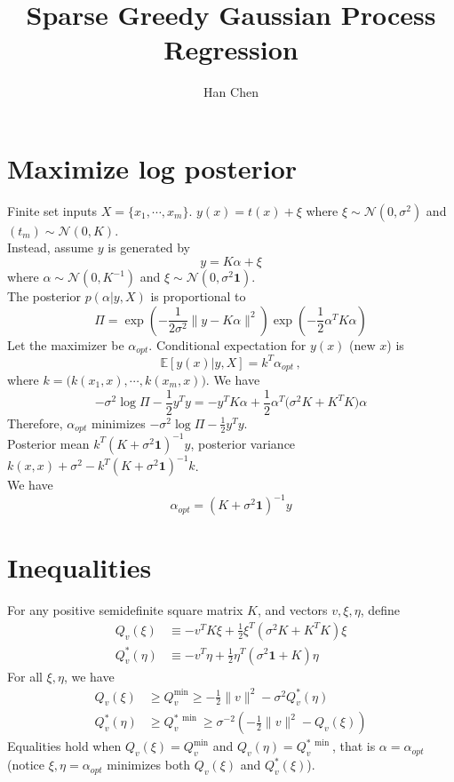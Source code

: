 \documentclass[a4paper,onecolumn]{article}
\begin{document}
\setcounter{page}{1}

\title{Sparse Greedy Gaussian Process Regression}
\date{}
\author{Han Chen}
\maketitle
\section{Maximize log posterior}
Finite set inputs $X = \{x_1,\cdots, x_m\}$.
$
    y(x) = t(x)+\xi
$
where $\xi\sim \mathcal{N}(0, \sigma^2)$ and $(t_m) \sim \mathcal{N}(0, K)$.\\

Instead, assume $y$ is generated by
$$
    y = K\alpha + \xi
$$
where $\alpha \sim \mathcal{N}(0, K^{-1})$ and $\xi \sim \mathcal{N}(0,\sigma^2\mathbf{1})$.\\
The posterior $p(\alpha|y, X)$ is proportional to
$$
    \Pi = \exp(-\frac{1}{2 \sigma^2} \|y-K\alpha\|^2) \exp(-\frac{1}{2}\alpha^T K \alpha)
$$
Let the maximizer be $\alpha_{opt}$.
Conditional expectation for $y(x)$ (new $x$) is
$$
    \mathbb{E}[y(x)| y, X] =  k^T \alpha_{opt}\,,
$$
where $k = \big( k(x_1, x), \cdots, k(x_m, x)\big)$.
We have
$$
    -\sigma^2 \log \Pi - \frac{1}{2}y^T y=
    - y^T K\alpha + \frac{1}{2} \alpha^T \big( \sigma^2 K + K^T K \big)\alpha
$$
Therefore, $\alpha_{opt}$ minimizes $-\sigma^2 \log \Pi - \frac{1}{2}y^T y$.\\
Posterior mean $k^T (K+\sigma^2 \mathbf{1})^{-1} y$, posterior variance
$k(x,x)+ \sigma^2 - k^T (K+\sigma^2\mathbf{1})^{-1}k$.\\
We have 
$$
    \alpha_{opt} = (K+\sigma^2 \mathbf{1})^{-1} y
$$
\section{Inequalities}
For any positive semidefinite square matrix $K$, and vectors $v, \xi, \eta$, define
\begin{equation*}\begin{split}
    Q_v(\xi) & \equiv - v^T K \xi + \frac{1}{2} \xi^T (\sigma^2 K + K^T K) \xi\\
    Q^*_v(\eta) &\equiv - v^T \eta + \frac{1}{2}\eta^T (\sigma^2 \mathbf{1} + K)\eta
\end{split}\end{equation*}
For all $\xi, \eta$, we have
\begin{equation*}\begin{split}
    Q_v(\xi) &\ge Q_{v}^{\min} \ge -\frac{1}{2}\|v\|^2 - \sigma^2 Q^*_v(\eta)\\
    Q_v^*(\eta) &\ge Q^{*\, \min}_v \ge \sigma^{-2} \left(- \frac{1}{2}\|v\|^2 - Q_v(\xi)\right)
\end{split}\end{equation*}
Equalities hold when $Q_v(\xi) = Q_v^{\min}$ and $Q_v(\eta) = Q^{*\, \min}_v$, that is
$\alpha=\alpha_{opt}$ (notice $\xi,\eta=\alpha_{opt}$ minimizes both $Q_v(\xi)$ and $Q_v^*(\xi)$). 
\end{document}
